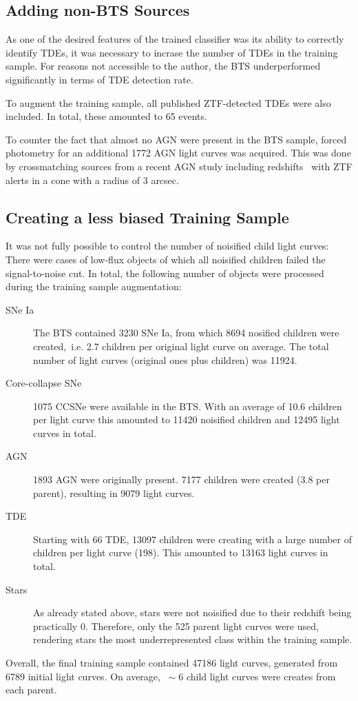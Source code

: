 \subsection{Adding non-BTS Sources}\label{addsources}
As one of the desired features of the trained classifier was its ability to correctly identify TDEs, it was necessary to incrase the number of TDEs in the training sample. For reasons not accessible to the author, the BTS underperformed significantly in terms of TDE detection rate.

To augment the training sample, all published ZTF-detected TDEs were also included. In total, these amounted to 65 events.

To counter the fact that almost no AGN were present in the BTS sample, forced photometry for an additional 1772 AGN light curves was acquired. This was done by crossmatching sources from a recent AGN study including redshifts~ with ZTF alerts in a cone with a radius of 3 arcsec.

\subsection{Creating a less biased Training Sample}
It was not fully possible to control the number of noisified child light curves: There were cases of low-flux objects of which all noisified children failed the signal-to-noise cut. In total, the following number of objects were processed during the training sample augmentation:
\begin{description}
  \item[SNe Ia] The BTS contained 3230 SNe Ia, from which 8694 nosified children were created,~i.e. 2.7 children per original light curve on average. The total number of light curves (original ones plus children) was 11924.
  \item[Core-collapse SNe] 1075 CCSNe were available in the BTS. With an average of 10.6 children per light curve this amounted to 11420 noisified children and 12495 light curves in total.
  \item[AGN] 1893 AGN were originally present. 7177 children were created (3.8 per parent), resulting in 9079 light curves.
  \item[TDE] Starting with 66 TDE, 13097 children were creating with a large number of children per light curve (198). This amounted to 13163 light curves in total.
  \item[Stars] As already stated above, stars were not noisified due to their redshift being practically 0. Therefore, only the 525 parent light curves were used, rendering stars the most underrepresented class within the training sample.
\end{description}
Overall, the final training sample contained 47186 light curves, generated from 6789 initial light curves. On average, $~\sim 6$ child light curves were creates from each parent.


